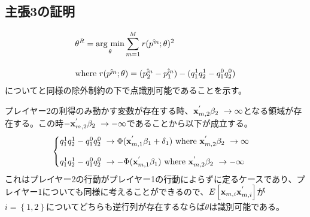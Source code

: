 \documentclass{jsarticle}
\newcommand{\argmin}{\mathop{\rm arg~min}\limits}
\begin{document}
\subsection{主張3の証明}
\begin{align*}
	&\theta^R = \argmin_{\theta} \sum_{m = 1}^M r(\hat{p^m} ; \theta)^2\\[10pt]
	&\text{where}\ r(\hat{p^m} ; \theta) = (\hat{p_2^m} - \hat{p_1^m}) - (q_1^1 q_2^1 - q_1^0 q_2^0)
\end{align*}
について\cite{Tamer2003a}と同様の除外制約の下で点識別可能であることを示す。

プレイヤー2の利得のみ動かす変数が存在する時、${\bf x}_{m, 2}^{'} \beta_2\ \to \infty$となる領域が存在する。この時$-{\bf x}_{m, 2}^{'} \beta_2\ \to -\infty$であることから以下が成立する。
\begin{align*}
\begin{cases}
	q_1^1 q_2^1 - q_1^0 q_2^0\ \to \Phi({\bf x}_{m, 1}^{'} \beta_1 + \delta_1)\ \text{where}\ {\bf x}_{m, 2}^{'} \beta_2\ \to \infty\\[10pt]
	q_1^1 q_2^1 - q_1^0 q_2^0\ \to -\Phi({\bf x}_{m, 1}^{'} \beta_1)\ \text{where}\ {\bf x}_{m, 2}^{'} \beta_2\ \to -\infty
\end{cases}
\end{align*}
これはプレイヤー2の行動がプレイヤー1の行動によらずに定るケースであり、プレイヤー1についても同様に考えることができるので、$E\left[ {\bf x}_{m, i} {\bf x}_{m, i}^{'} \right]$が$i = \left\{ 1,2 \right\}$についてどちらも逆行列が存在するならば$\theta$は識別可能である。



\end{document}
